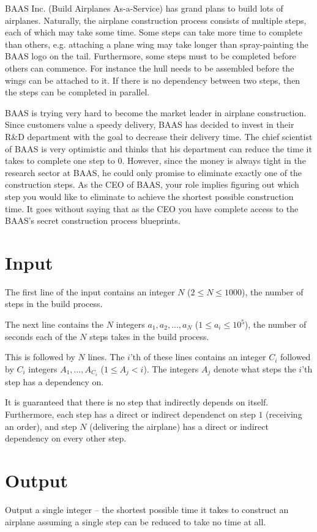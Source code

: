 BAAS Inc. (Build Airplanes As-a-Service) has grand plans to build lots of airplanes.
Naturally, the airplane construction process consists of multiple steps, each of which may take some time.
Some steps can take more time to complete than others, e.g. attaching a plane wing may take longer than spray-painting the BAAS logo on the tail.
Furthermore, some steps must to be completed before others can commence.
For instance the hull needs to be assembled before the wings can be attached to it.
If there is no dependency between two steps, then the steps can be completed in parallel.

BAAS is trying very hard to become the market leader in airplane construction.
Since customers value a speedy delivery, BAAS has decided to invest in their R\&D department with the goal to decrease their delivery time.
The chief scientist of BAAS is very optimistic and thinks that his department can reduce the time it takes to complete one step to 0.
However, since the money is always tight in the research sector at BAAS, he could only promise to eliminate exactly one of the construction steps.
As the CEO of BAAS, your role implies figuring out which step you would like to eliminate to achieve the shortest possible construction time.
It goes without saying that as the CEO you have complete access to the BAAS's secret construction process blueprints.

\section*{Input}
The first line of the input contains an integer $N$ ($2 \le N \le 1000$), the number of steps in the build process.

The next line contains the $N$ integers $a_1, a_2, ..., a_N$ ($1 \le a_i \le 10^5$), the number of seconds each of the $N$ steps takes in the build process.

This is followed by $N$ lines.
The $i$'th of these lines contains an integer $C_i$ followed by $C_i$ integers $A_1, \dots, A_{C_i}$ ($1 \le A_j < i$).
The integers $A_j$ denote what steps the $i$'th step has a dependency on.

It is guaranteed that there is no step that indirectly depends on itself.
Furthermore, each step has a direct or indirect dependenct on step $1$ (receiving an order), and step $N$ (delivering the airplane) has a direct or indirect dependency on every other step.

\section*{Output}
Output a single integer -- the shortest possible time it takes to construct an airplane assuming a single step can be reduced to take no time at all.
